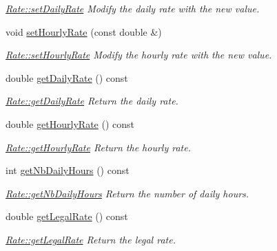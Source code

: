 \begin{DoxyCompactItemize}
\begin{DoxyCompactList}\small\item\em \hyperlink{classModels_1_1Rate_a2f07614aa1d1a4957fd8d4de4d3680d5}{Rate\-::set\-Daily\-Rate} Modify the daily rate with the new value. \end{DoxyCompactList}\item 
\hypertarget{classModels_1_1Rate_a75a770086f7ef9e702b961a32fc735b5}{void \hyperlink{classModels_1_1Rate_a75a770086f7ef9e702b961a32fc735b5}{set\-Hourly\-Rate} (const double \&)}\label{classModels_1_1Rate_a75a770086f7ef9e702b961a32fc735b5}

\begin{DoxyCompactList}\small\item\em \hyperlink{classModels_1_1Rate_a75a770086f7ef9e702b961a32fc735b5}{Rate\-::set\-Hourly\-Rate} Modify the hourly rate with the new value. \end{DoxyCompactList}\item 
double \hyperlink{classModels_1_1Rate_a937b0efecbc5b3561ad08fe712165d0b}{get\-Daily\-Rate} () const 
\begin{DoxyCompactList}\small\item\em \hyperlink{classModels_1_1Rate_a937b0efecbc5b3561ad08fe712165d0b}{Rate\-::get\-Daily\-Rate} Return the daily rate. \end{DoxyCompactList}\item 
double \hyperlink{classModels_1_1Rate_ac4c3d9c09bed20d639997da7d6c6798b}{get\-Hourly\-Rate} () const 
\begin{DoxyCompactList}\small\item\em \hyperlink{classModels_1_1Rate_ac4c3d9c09bed20d639997da7d6c6798b}{Rate\-::get\-Hourly\-Rate} Return the hourly rate. \end{DoxyCompactList}\item 
int \hyperlink{classModels_1_1Rate_a08add6d8b4db1b9a37a3f9cc22d0d0df}{get\-Nb\-Daily\-Hours} () const 
\begin{DoxyCompactList}\small\item\em \hyperlink{classModels_1_1Rate_a08add6d8b4db1b9a37a3f9cc22d0d0df}{Rate\-::get\-Nb\-Daily\-Hours} Return the number of daily hours. \end{DoxyCompactList}\item 
double \hyperlink{classModels_1_1Rate_aa06f56d236743c66b2e6b1bc772b9233}{get\-Legal\-Rate} () const 
\begin{DoxyCompactList}\small\item\em \hyperlink{classModels_1_1Rate_aa06f56d236743c66b2e6b1bc772b9233}{Rate\-::get\-Legal\-Rate} Return the legal rate. \end{DoxyCompactList}\end{DoxyCompactItemize}


